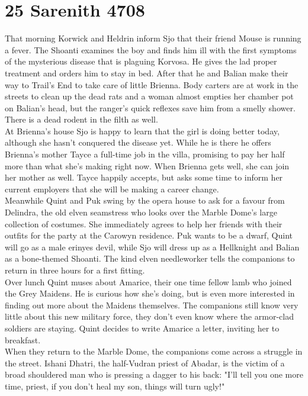 \section{25 Sarenith 4708}

That morning Korwick and Heldrin inform Sjo that their friend Mouse is running a fever. The Shoanti examines the boy and finds him ill with the first symptoms of the mysterious disease that is plaguing Korvosa. He gives the lad proper treatment and orders him to stay in bed. After that he and Balian make their way to Trail's End to take care of little Brienna. Body carters are at work in the streets to clean up the dead rats and a woman almost empties her chamber pot on Balian's head, but the ranger's quick reflexes save him from a smelly shower. There is a dead rodent in the filth as well.\\

At Brienna's house Sjo is happy to learn that the girl is doing better today, although she hasn't conquered the disease yet. While he is there he offers Brienna's mother Tayce a full-time job in the villa, promising to pay her half more than what she's making right now. When Brienna gets well, she can join her mother as well. Tayce happily accepts, but asks some time to inform her current employers that she will be making a career change.\\

Meanwhile Quint and Puk swing by the opera house to ask for a favour from Delindra, the old elven seamstress who looks over the Marble Dome's large collection of costumes. She immediately agrees to help her friends with their outfits for the party at the Carowyn residence. Puk wants to be a dwarf, Quint will go as a male erinyes devil, while Sjo will dress up as a Hellknight and Balian as a bone-themed Shoanti. The kind elven needleworker tells the companions to return in three hours for a first fitting.\\

Over lunch Quint muses about Amarice, their one time fellow lamb who joined the Grey Maidens. He is curious how she's doing, but is even more interested in finding out more about the Maidens themselves. The companions still know very little about this new military force, they don't even know where the armor-clad soldiers are staying. Quint decides to write Amarice a letter, inviting her to breakfast.\\

When they return to the Marble Dome, the companions come across a struggle in the street. Ishani Dhatri, the half-Vudran priest of Abadar, is the victim of a broad shouldered man who is pressing a dagger to his back: "I'll tell you one more time, priest, if you don't heal my son, things will turn ugly!"\\

